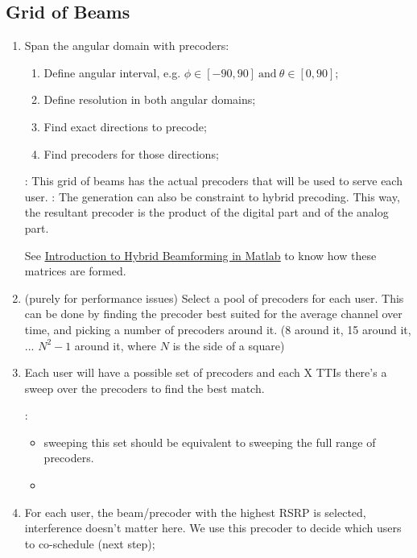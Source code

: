 \subsection*{Grid of Beams}
\begin{enumerate}
    \item Span the angular domain with precoders:
        \begin{enumerate} [label=\roman*.]
            \item Define angular interval, e.g. $\phi \in [-90, 90] \ \text{and} \  \theta \in [0, 90]$;
            \item Define resolution in both angular domains;
            \item Find exact directions to precode;
            \item Find precoders for those directions;
        \end{enumerate}
        
        : This grid of beams has the actual precoders that will be used to serve each user.
        : The generation can also be constraint to hybrid precoding. This way, the resultant precoder is the product of the digital part and of the analog part.

        See \href{https://www.mathworks.com/help/phased/examples/introduction-to-hybrid-beamforming.html}{\ul{Introduction to Hybrid Beamforming in Matlab}} to know how these matrices are formed.
    
    \item (purely for performance issues) Select a pool of precoders for each user. This can be done by finding the precoder best suited for the average channel over time, and picking a number of precoders around it. (8 around it, 15 around it, ... $N^2 - 1$ around it, where $N$ is the side of a square)
    \item Each user will have a possible set of precoders and each X TTIs there's a sweep over the precoders to find the best match. 
    
    : 
        \begin{itemize}
            \item sweeping this set should be equivalent to sweeping the full range of precoders. 
            \item {}
        \end{itemize}
    
    
    \item For each user, the beam/precoder with the highest RSRP is selected, interference doesn't matter here. We use this precoder to decide which users to co-schedule (next step);
    

\end{enumerate}
